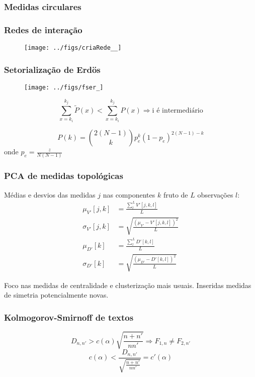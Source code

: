 \documentclass[10pt]{beamer}
\begin{document}
\begin{frame}
\frametitle{Medidas circulares}
\end{frame}
\begin{frame}
\frametitle{Redes de interação}
\begin{figure}[!h]
    \centering
    \texttt{[image: ../figs/criaRede\_\_]}
\end{figure}
\end{frame}
\begin{frame}
\frametitle{Setorialização de Erdös}

\begin{figure}[!h]
    \centering
    \texttt{[image: ../figs/fser\_]}
        \label{fig:setores}
\end{figure}

\begin{equation}\label{criterio2}
    \sum_{x=k_i}^{k_j} \widetilde{P}(x) < \sum_{x=k_i}^{k_j} P(x) \Rightarrow \text{i é intermediário}
\end{equation}

\begin{equation}
    P(k)=\binom{2(N-1)}{k}p_e^k(1-p_e)^{2(N-1)-k}
\end{equation}
onde 
\centering
$p_e=\frac{z}{N(N-1)}$


\end{frame}
\begin{frame}
\frametitle{PCA de medidas topológicas}
Médias e desvios das medidas $j$ nas componentes $k$ fruto de $L$ observações $l$:
\begin{align}\label{eq:pca}
\mu_{V'}[j,k]   &=\frac{\sum_l^L V'[j,k,l]}{L}\nonumber\\
\sigma_{V'}[j,k]&=\sqrt{\frac{(\mu_{V'}-V'[j,k,l])^2}{L}}\\\nonumber
\mu_{D'}[k]&=\frac{\sum_l^L D'[k,l]}{L}\\\nonumber
\sigma_{D'}[k]&=\sqrt{\frac{(\mu_{D'}-D'[k,l])^2}{L}}
\end{align}

Foco nas medidas de centralidade e clusterização mais usuais. 
Inseridas medidas de simetria potencialmente novas.

\end{frame}
\begin{frame}
\frametitle{Kolmogorov-Smirnoff de textos}
\begin{equation}\label{eq:ks}
D_{n,n'} > c(\alpha)\sqrt{\frac{n+n'}{nn'}} \Rightarrow F_{1,n} \neq F_{2,n'}
\end{equation}
\vspace{2cm}
\begin{equation}\label{eq:ks}
c(\alpha) < \frac{D_{n,n'}}{\sqrt{\frac{n+n'}{nn'}}} = c'(\alpha)
\end{equation}
\end{frame}
\end{document}
